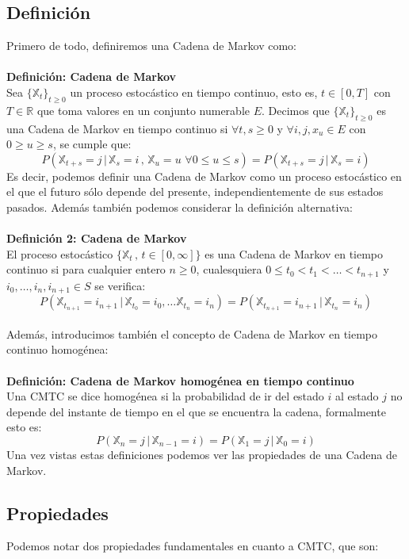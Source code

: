 \documentclass[12pt,a4paper]{article}
\begin{document}
\subsection{Definición}
Primero de todo, definiremos una Cadena de Markov como:
\\\\
\textbf{Definición: Cadena de Markov}
\\
Sea $\{\mathbb{X}_t\}_{t\geq 0}$ un proceso estocástico en tiempo continuo, esto es, $t\in [0,T]$ con $T\in \mathbb{R}$ que toma valores en un conjunto numerable $E$. Decimos que $\{\mathbb{X}_t\}_{t\geq 0}$ es una Cadena de Markov en tiempo continuo si $\forall t,s\geq 0$ y $\forall i,j,x_u\in E$ con $0\geq u \geq s$, se cumple que:
$$P(\mathbb{X}_{t+s}=j \, | \, \mathbb{X}_s =i \, , \,  \mathbb{X}_u =  u \,\, \forall 0\leq u\leq s)=P(\mathbb{X}_{t+s}=j \, | \, \mathbb{X}_s = i)$$
Es decir, podemos definir una Cadena de Markov como un proceso estocástico	en el que el futuro sólo depende del presente, independientemente de sus estados pasados. Además también podemos considerar la definición alternativa:
\\\\
\textbf{Definición 2: Cadena de Markov}
\\
El proceso estocástico $\{\mathbb{X}_t \, , \, t\in [0,\infty]\}$ es una Cadena de Markov en tiempo continuo si para cualquier entero $n\geq 0$, cualesquiera $0\leq t_0 < t_1 < \ldots < t_{n+1}$ y $i_0,\ldots , i_n,i_{n+1}\in S$ se verifica:
$$P(\mathbb{X}_{t_{n+1}}=i_{n+1}\, | \, \mathbb{X}_{t_0}=i_0 , \ldots \mathbb{X}_{t_n}=i_n)=P(\mathbb{X}_{t_{n+1}}=i_{n+1}\, | \, \mathbb{X}_{t_n}=i_n)$$\\
Además, introducimos también el concepto de Cadena de Markov en tiempo continuo homogénea:
\\\\
\textbf{Definición: Cadena de Markov homogénea en tiempo continuo}
\\
Una CMTC se dice homogénea si la probabilidad de ir del estado $i$ al estado $j$ no depende del instante de tiempo en el que se encuentra la cadena, formalmente esto es:
$$P(\mathbb{X}_n=j \, | \, \mathbb{X}_{n-1}=i)=P(\mathbb{X}_1=j \, | \, \mathbb{X}_0=i)$$
Una vez vistas estas definiciones podemos ver las propiedades de una Cadena de Markov.
\subsection{Propiedades}
Podemos notar dos propiedades fundamentales en cuanto a CMTC, que son:
\end{document}
